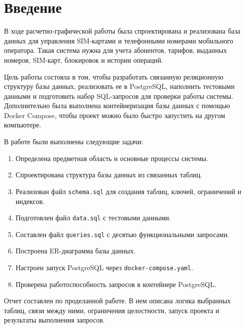 \chapter*{Введение}

В ходе расчетно-графической работы была спроектирована и реализована база данных для управления SIM-картами и телефонными номерами мобильного оператора. Такая система нужна для учета абонентов, тарифов, выданных номеров, SIM-карт, блокировок и истории операций.

Цель работы состояла в том, чтобы разработать связанную реляционную структуру базы данных, реализовать ее в PostgreSQL, наполнить тестовыми данными и подготовить набор SQL-запросов для проверки работы системы. Дополнительно была выполнена контейнеризация базы данных с помощью Docker Compose, чтобы проект можно было быстро запустить на другом компьютере.

В работе были выполнены следующие задачи:

\begin{enumerate}
    \item Определена предметная область и основные процессы системы.
    \item Спроектирована структура базы данных из связанных таблиц.
    \item Реализован файл \texttt{schema.sql} для создания таблиц, ключей, ограничений и индексов.
    \item Подготовлен файл \texttt{data.sql} с тестовыми данными.
    \item Составлен файл \texttt{queries.sql} с десятью функциональными запросами.
    \item Построена ER-диаграмма базы данных.
    \item Настроен запуск PostgreSQL через \texttt{docker-compose.yaml}.
    \item Проверена работоспособность запросов в контейнере PostgreSQL.
\end{enumerate}

Отчет составлен по проделанной работе. В нем описана логика выбранных таблиц, связи между ними, ограничения целостности, запуск проекта и результаты выполнения запросов.
